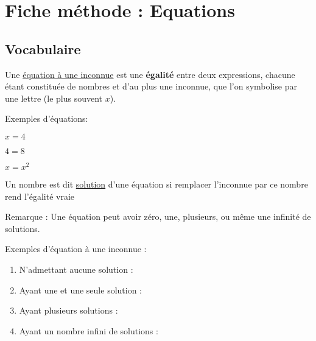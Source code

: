 \documentclass[10pt,a4paper]{book}
\begin{document}

\chapter{Fiche méthode : Equations}

\section{Vocabulaire}

\begin{de}
    Une \underline{équation à une inconnue} est une  \textbf{égalité} entre deux expressions, chacune étant constituée de nombres et d'au plus une inconnue, que l'on symbolise par une lettre (le plus souvent $x$).
    
\end{de}

Exemples d'équations:

$x = 4$

$4 = 8$

$x = x^2$



\begin{de}
    Un nombre est dit \underline{solution} d'une équation si remplacer l'inconnue par ce nombre rend l'égalité vraie
\end{de}

Remarque : Une équation peut avoir zéro, une, plusieurs, ou même une infinité de solutions.

Exemples d'équation à une inconnue :
    \begin{enumerate}
        \item N'admettant aucune solution :
        \item Ayant une et une seule solution :
        \item Ayant plusieurs solutions :
        \item Ayant un nombre infini de solutions :
        
    \end{enumerate}
\end{document}
